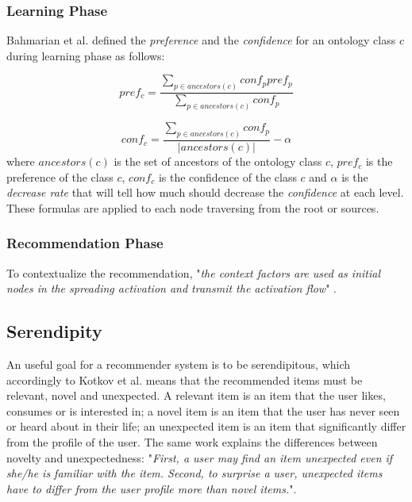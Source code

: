 \subsubsection{Learning Phase}
Bahmarian et al. \cite{bahramian_abbaspour_claramunt_2017} defined the \textit{preference} and the \textit{confidence} for an ontology class $c$ during learning phase as follows:

\begin{equation} \label{eq:preference}
    pref_c = \frac{\displaystyle \sum_{p \in ancestors(c)}{conf_p pref_p}}
                    {\displaystyle  \sum_{p \in ancestors(c)} {conf_p}}
\end{equation}

\begin{equation} \label{eq:confidence}
    conf_c = \frac{\displaystyle \sum_{p \in ancestors(c)} {conf_p}}{|ancestors(c)|} - \alpha
\end{equation}
where $ancestors(c)$ is the set of ancestors of the ontology class $c$, $pref_c$ is the preference of the class $c$, $conf_c$ is the confidence of the class $c$ and $\alpha$ is the \textit{decrease rate} that will tell how much should decrease the \textit{confidence} at each level. These formulas are applied to each node traversing from the root or sources.

\subsubsection{Recommendation Phase}
To contextualize the recommendation, "\textit{the context factors are used as initial nodes in the spreading activation and transmit the activation flow}" \cite{bahramian_abbaspour_claramunt_2017}.

\subsection{Serendipity} \label{section:serendipity}
An useful goal for a recommender system is to be serendipitous, which accordingly to Kotkov et al. \cite{kotkov2016survey} means that the recommended items must be relevant, novel and unexpected. A relevant item is an item that the user likes, consumes or is interested in; a novel item is an item that the user has never seen or heard about in their life; an unexpected item is an item that significantly differ from the profile of the user. The same work explains the differences between novelty and unexpectedness: "\textit{First, a user may find an item unexpected even if she/he is familiar with the item. Second, to surprise a user, unexpected items have to differ from the user profile more than novel items.}".

